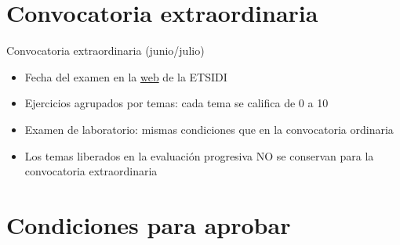 \documentclass[aspectratio=169, usenames,svgnames,dvipsnames]{beamer}
\begin{document}

\section*{Convocatoria extraordinaria}

\begin{frame}{Convocatoria extraordinaria (junio/julio)}

    \vspace{-18mm}
    \begin{itemize}
        \item Fecha del examen en la \href{https://www.etsidi.upm.es/Estudiantes/AgendaAcademica/AAFechaExamenes}{web} de la ETSIDI
        \item Ejercicios agrupados por temas: cada tema se califica de 0 a 10
        \item Examen de laboratorio: mismas condiciones que en la convocatoria ordinaria

        \vspace{6mm}

        \item Los temas liberados en la evaluación progresiva \alert{NO} se conservan para la convocatoria extraordinaria
    \end{itemize}

\end{frame}
        

\section*{Condiciones para aprobar}
\end{document}
